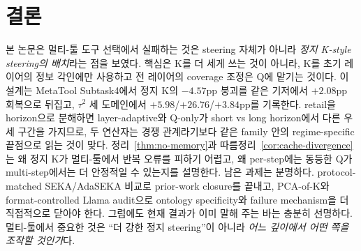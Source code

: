 \section{결론}

본 논문은 멀티-툴 도구 선택에서 실패하는 것은 steering 자체가 아니라 \emph{정지 K-style steering의 배치}라는 점을 보였다. 핵심은 K를 더 세게 쓰는 것이 아니라, K를 초기 레이어의 정보 각인에만 사용하고 전 레이어의 coverage 조정은 Q에 맡기는 것이다. 이 설계는 MetaTool Subtask4에서 정지 K의 $-4.57$pp 붕괴를 같은 기저에서 $+2.08$pp 회복으로 뒤집고, $\tau^2$ 세 도메인에서 $+5.98$/$+26.76$/$+3.84$pp를 기록한다. retail을 horizon으로 분해하면 layer-adaptive와 Q-only가 short vs long horizon에서 다른 우세 구간을 가지므로, 두 연산자는 경쟁 관계라기보다 같은 family 안의 regime-specific 끝점으로 읽는 것이 맞다. 정리~\ref{thm:no-memory}과 따름정리~\ref{cor:cache-divergence}는 왜 정지 K가 멀티-툴에서 반복 오류를 피하기 어렵고, 왜 per-step에는 동등한 Q가 multi-step에서는 더 안정적일 수 있는지를 설명한다. 남은 과제는 분명하다. protocol-matched SEKA/AdaSEKA 비교로 prior-work closure를 끝내고, PCA-of-K와 format-controlled Llama audit으로 ontology specificity와 failure mechanism을 더 직접적으로 닫아야 한다. 그럼에도 현재 결과가 이미 말해 주는 바는 충분히 선명하다. 멀티-툴에서 중요한 것은 ``더 강한 정지 steering''이 아니라 \emph{어느 깊이에서 어떤 쪽을 조작할 것인가}다.
